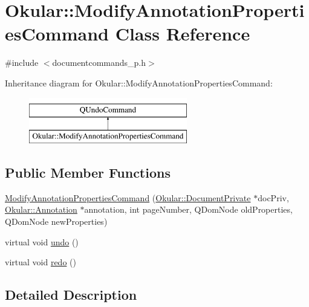 \hypertarget{classOkular_1_1ModifyAnnotationPropertiesCommand}{\section{Okular\+:\+:Modify\+Annotation\+Properties\+Command Class Reference}
\label{classOkular_1_1ModifyAnnotationPropertiesCommand}
}


{\ttfamily \#include $<$documentcommands\+\_\+p.\+h$>$}

Inheritance diagram for Okular\+:\+:Modify\+Annotation\+Properties\+Command\+:\begin{figure}[H]
\begin{center}
\leavevmode
\includegraphics[height=2.000000cm]{classOkular_1_1ModifyAnnotationPropertiesCommand}
\end{center}
\end{figure}
\subsection*{Public Member Functions}
\begin{DoxyCompactItemize}
\item 
\hyperlink{classOkular_1_1ModifyAnnotationPropertiesCommand_ac499609fbc473896677042e264b2cd2d}{Modify\+Annotation\+Properties\+Command} (\hyperlink{classOkular_1_1DocumentPrivate}{Okular\+::\+Document\+Private} $\ast$doc\+Priv, \hyperlink{classOkular_1_1Annotation}{Okular\+::\+Annotation} $\ast$annotation, int page\+Number, Q\+Dom\+Node old\+Properties, Q\+Dom\+Node new\+Properties)
\item 
virtual void \hyperlink{classOkular_1_1ModifyAnnotationPropertiesCommand_a1723ff7ac09a78181bd16e59daa1be53}{undo} ()
\item 
virtual void \hyperlink{classOkular_1_1ModifyAnnotationPropertiesCommand_a6b374fd1472ecc41fb57a86596eafc4e}{redo} ()
\end{DoxyCompactItemize}


\subsection{Detailed Description}


